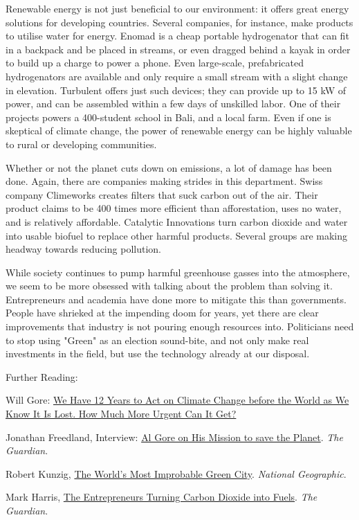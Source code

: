    Renewable energy is not just beneficial to our environment: it offers
   great energy solutions for developing countries. Several companies, for
   instance, make products to utilise water for energy. Enomad is a cheap
   portable hydrogenator that can fit in a backpack and be placed in
   streams, or even dragged behind a kayak in order to build
   up a charge to power a phone. Even large-scale, prefabricated
   hydrogenators are available and only require a small stream with a
   slight change in elevation. Turbulent offers just such devices; they
   can provide up to 15 kW of power, and can be assembled within a few
   days of unskilled labor. One of their projects powers
   a 400-student school in Bali, and a local farm. Even if one is
   skeptical of climate change, the power of renewable energy can be
   highly valuable to rural or developing communities.

   Whether or not the planet cuts down on emissions, a lot of damage has
   been done. Again, there are companies making strides in this
   department. Swiss company Climeworks creates filters that suck carbon
   out of the air. Their product claims to be 400 times more efficient
   than afforestation, uses no water, and is relatively
   affordable. Catalytic Innovations turn carbon dioxide and water into
   usable biofuel to replace other harmful products. Several groups are
   making headway towards reducing pollution.

   While society continues to pump harmful greenhouse gasses into the
   atmosphere, we seem to be more obsessed with talking about the problem
   than solving it. Entrepreneurs and academia have done more to mitigate
   this than governments. People have shrieked at the impending doom for
   years, yet there are clear improvements that industry is not pouring
   enough resources into. Politicians need to stop using "Green" as an
   election sound-bite, and not only make real investments in the field,
   but use the technology already at our disposal.

   Further Reading:

Will Gore: \href{https://www.independent.co.uk/voices/climate-change-ipcc-envi
   ronment-paris-agreement-global-warming-a8573811.html}{We Have 12 Years to Act on Climate Change before the
   World as We Know It Is Lost. How Much More Urgent Can It Get?} 

Jonathan Freedland, Interview: \href{https://www.theguardian.com/film/2006/may/31/usa.environment.}{Al Gore on His Mission to save the
   Planet}. \textit{The Guardian}. 

Robert Kunzig, \href{https://www.nationalgeographic.com/environment/urban-expediti
   ons/green-buildings/dubai-ecological-footprint-sustainable-urban-city/}{The World's Most Improbable Green City}. \textit{National
   Geographic}. 
   
Mark Harris, \href{https://www.theguardian.com/sustainable-business/2017/sep/14/entreprene
   urs-turn-carbon-dioxide-into-fuels-artificial-photosynthesis}{The Entrepreneurs Turning Carbon Dioxide into Fuels}. \textit{The Guardian}. 
   
